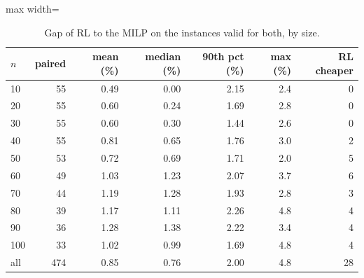 \begin{table}[H]\centering
\small
\caption{Gap of RL to the MILP on the instances valid for both, by size.}\label{tab:gapn}
\begin{adjustbox}{max width=\textwidth}\begin{tabular}{lrrrrrr}\toprule
$n$ & paired & mean (\%) & median (\%) & 90th pct (\%) & max (\%) & RL cheaper \\ \midrule
10 & 55 & 0.49 & 0.00 & 2.15 & 2.4 & 0 \\
20 & 55 & 0.60 & 0.24 & 1.69 & 2.8 & 0 \\
30 & 55 & 0.60 & 0.30 & 1.44 & 2.6 & 0 \\
40 & 55 & 0.81 & 0.65 & 1.76 & 3.0 & 2 \\
50 & 53 & 0.72 & 0.69 & 1.71 & 2.0 & 5 \\
60 & 49 & 1.03 & 1.23 & 2.07 & 3.7 & 6 \\
70 & 44 & 1.19 & 1.28 & 1.93 & 2.8 & 3 \\
80 & 39 & 1.17 & 1.11 & 2.26 & 4.8 & 4 \\
90 & 36 & 1.28 & 1.38 & 2.22 & 3.4 & 4 \\
100 & 33 & 1.02 & 0.99 & 1.69 & 4.8 & 4 \\
all & 474 & 0.85 & 0.76 & 2.00 & 4.8 & 28 \\
\bottomrule\end{tabular}\end{adjustbox}\end{table}

